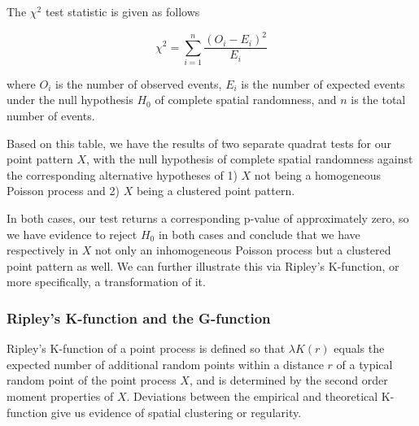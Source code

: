 \documentclass[
  12pt,
]{article}
\begin{document}
The \(\chi^2\) test statistic is given as follows

\[\chi^2 = \sum_{i=1}^n \frac{(O_i - E_i)^2}{E_i}\]

where \(O_i\) is the number of observed events, \(E_i\) is the number of
expected events under the null hypothesis \(H_0\) of complete spatial
randomness, and \(n\) is the total number of events.

\begin{table}[!h]

\caption{\label{tab:tbl-quadrat-test}The results of the quadrat tests of the point process.}
\centering
{}
\end{table}

Based on this table, we have the results of two separate quadrat tests
for our point pattern \(X\), with the null hypothesis of complete
spatial randomness against the corresponding alternative hypotheses of
1) \(X\) not being a homogeneous Poisson process and 2) \(X\) being a
clustered point pattern.

In both cases, our test returns a corresponding p-value of approximately
zero, so we have evidence to reject \(H_0\) in both cases and conclude
that we have respectively in \(X\) not only an inhomogeneous Poisson
process but a clustered point pattern as well. We can further illustrate
this via Ripley's K-function, or more specifically, a transformation of
it.

\hypertarget{ripleys-k-function-and-the-g-function}{%
\subsubsection{Ripley's K-function and the
G-function}\label{ripleys-k-function-and-the-g-function}}

Ripley's K-function of a point process is defined so that
\(\lambda K(r)\) equals the expected number of additional random points
within a distance \(r\) of a typical random point of the point process
\(X\), and is determined by the second order moment properties of \(X\).
Deviations between the empirical and theoretical K-function give us
evidence of spatial clustering or regularity.
\end{document}

